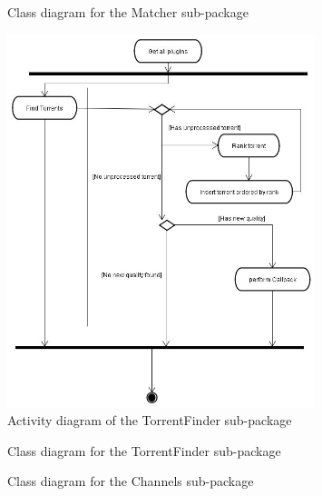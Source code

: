 \begin{figure}[hp]
  \centering
\tikzimgMatcher
  \caption{Class diagram for the Matcher sub-package}
  \label{fig:classdiagrammatcher}
\end{figure}

\begin{figure}[hp]
  \centering
      \includegraphics[width=0.8\textwidth]{TorrentFinder-activitydiagram.jpg}
  \caption{Activity diagram of the TorrentFinder sub-package}
  \label{fig:activitytorrentfinder}
\end{figure}

\begin{figure}[hp]
  \centering
\tikzimgTorrentFinder
  \caption{Class diagram for the TorrentFinder sub-package}
  \label{fig:classdiagramtorrentfinder}
\end{figure}

\begin{figure}[hp]
  \centering
\tikzimgChannels
  \caption{Class diagram for the Channels sub-package}
  \label{fig:classdiagramchannels}
\end{figure}